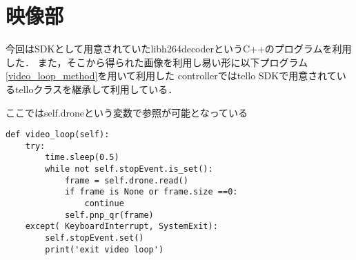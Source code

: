 \section{映像部}
\label{implement_video}
今回はSDKとして用意されていたlibh264decoderというC++のプログラムを利用した．
また，そこから得られた画像を利用し易い形に以下プログラム\ref{video_loop_method}を用いて利用した
controllerではtello SDKで用意されているtelloクラスを継承して利用している．

ここではself.droneという変数で参照が可能となっている
\begin{lstlisting}[caption=controller.py,label=video_loop_method]
def video_loop(self):
    try: 
        time.sleep(0.5)
        while not self.stopEvent.is_set():                
            frame = self.drone.read()
            if frame is None or frame.size ==0:
                continue
            self.pnp_qr(frame)
    except( KeyboardInterrupt, SystemExit):
        self.stopEvent.set()
        print('exit video loop')
\end{lstlisting}

